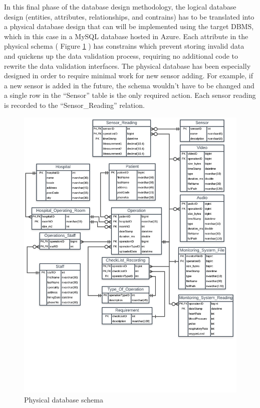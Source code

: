 In this final phase of the database design methodology, the logical database design (entities, attributes, relationships, and contrains) has to be translated into a physical database design that can will be implemented using the target DBMS, which in this case in a MySQL database hosted in Azure. Each attribute in the physical schema ( Figure  \ref{physical_schema} ) has constrains which prevent storing invalid data and quickens up the data validation process, requiring no additional code to rewrite the data validation interfaces. The physical database has been especially designed in order to require minimal work for new sensor adding. For example, if a new sensor is added in the future, the  schema wouldn't have to be changed and a single row in the ``Sensor'' table is the only required action. Each sensor reading is recorded to the ``Sensor\_Reading'' relation.

\begin{figure}[!ht]
\begin{center}
\includegraphics[width=17cm]{imgs/physical_schema.png}
\end{center}\vspace{-0.3cm}
\caption[Physical database schema]{Physical database schema} \label{physical_schema}
\end{figure}

